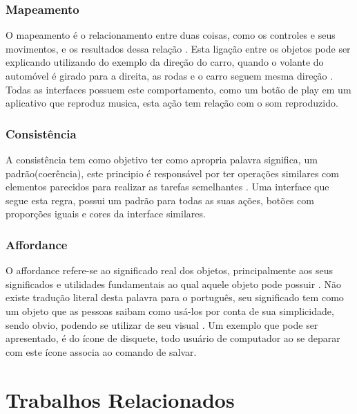 \documentclass[12pt,oneside,a4paper,chapter=TITLE,section=TITLE,sumario=tradicional]{abntex2}
\begin{document}
\subsection{Mapeamento}
\label{sec:mapeamento}

O mapeamento é o relacionamento entre duas coisas, como os controles e seus movimentos, e os resultados dessa relação \cite{norman2002}. Esta ligação entre os objetos pode ser explicando utilizando do exemplo da direção do carro, quando o volante do automóvel é girado para a direita, as rodas e o carro seguem mesma direção \cite{norman2002}. Todas as interfaces possuem este comportamento, como um botão de play em um aplicativo que reproduz musica, esta ação tem relação com o som reproduzido.

\subsection{Consistência}
\label{sec:consciencia}

A consistência tem como objetivo ter como apropria palavra significa, um padrão(coerência), este principio é responsável por ter operações similares com elementos parecidos para realizar as tarefas semelhantes \cite{agni2015}. Uma interface que segue esta regra, possui um padrão para todas as suas ações, botões com proporções iguais e cores da interface similares.

\subsection{Affordance}
\label{sec:affordance}

O affordance refere-se ao significado real dos objetos, principalmente aos seus significados e utilidades fundamentais ao qual aquele objeto pode possuir \cite{norman2002}. Não existe tradução literal desta palavra para o português, seu significado tem como um objeto que as pessoas saibam como usá-los por conta de sua simplicidade, sendo obvio, podendo se utilizar de seu visual \cite{agni2015}. Um exemplo que pode ser apresentado, é do ícone de disquete, todo usuário de computador ao se deparar com este ícone associa ao comando de salvar.

\chapter{Trabalhos Relacionados}
\label{cap:trabalhos-relacionados}
\end{document}
